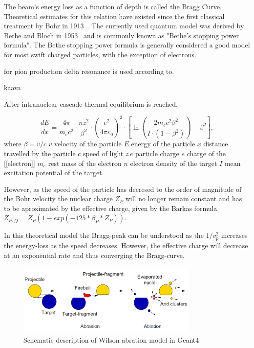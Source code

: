 The beam's energy loss as a function of depth is called the Bragg Curve. Theoretical estimates for this relation have existed since the first classical treatment by Bohr in 1913~\cite{bohr13}. The currently used quantum model was derived by Bethe and Bloch in 1953~\cite{bethebloch53}  and is commonly known as "Bethe's stopping power formula". The Bethe stopping power formula is generally considered a good model for most swift charged particles, with the exception of electrons.


for pion production delta resonance is used according to.

kaava

After intranuclear cascade thermal equilibrium is reached.

\begin{equation}
 \frac{dE}{dx} = \frac{4 \pi}{m_e c^2} \cdot \frac{nz^2}{\beta^2} \cdot \left(\frac{e^2}{4\pi\varepsilon_0}\right)^2 \cdot \left[\ln \left(\frac{2m_e c^2 \beta^2}{I \cdot (1-\beta^2)}\right) - \beta^2\right],
\label{bethebloch}
\end{equation}
where $\beta = v/c $ $v$ 
velocity of the particle 
$E$ 
energy of the particle
$x$ 
distance travelled by the particle
$c$ 
speed of light
$z\,e$ 
particle charge
$e$ 
charge of the [[electron]]
$m_e$ 
rest mass of the electron
$n$ 
electron density of the target
$I$ 
mean excitation potential of the target.


However, as the speed of the particle has decresed to the order of magnitude of the Bohr velocity the nuclear charge $Z_P$ will no longer remain constant and has to be aproximated by the effective charge, given by the Barkas formula $Z_{P_eff} = Z_P(1-exp(-125*\beta_{P}*Z_P))$.

In this theoretical model the Bragg-peak can be understood as the $1/v_{p}^2$ increases the energy-loss as the speed decreases. However, the effective charge will decrease at an exponential rate and thus converging the Bragg-curve.

\begin{figure}
\begin{center}
\includegraphics[width=0.8\textwidth]{images/ablationabration.png}  
\caption{Schematic description of Wilson abration model in Geant4}
 \label{fig:ablationabration}
 \end{center}
 \end{figure}



